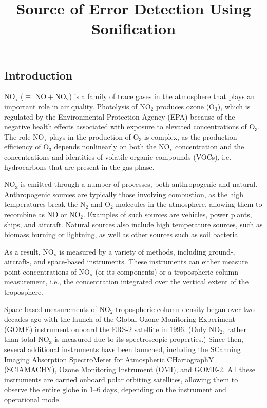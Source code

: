 \documentclass[a4paper,10pt,oneside]{article}
\title{Source of Error Detection Using Sonification}
\newcommand{\ce}[1]{$\mathrm{#1}$}
\begin{document}
\ninept
\maketitle

\begin{sloppy}

\begin{abstract}

\end{abstract}

\section{Introduction}
\label{sec:intro}

\ce{NO_x} ($\equiv$ \ce{NO + NO_2}) is a family of trace gases in the atmosphere that plays an important role in air quality.  Photolysis of \ce{NO_2} produces ozone (\ce{O_3}), which is regulated by the Environmental Protection Agency (EPA) because of the negative health effects associated with exposure to elevated concentrations of \ce{O_3}. The role \ce{NO_x} plays in the production of \ce{O_3} is complex, as the production efficiency of \ce{O_3} depends nonlinearly on both the \ce{NO_x} concentration and the concentrations and identities of volatile organic compounds (VOCs), i.e. hydrocarbons that are present in the gas phase.

\ce{NO_x} is emitted through a number of processes, both anthropogenic and natural. Anthropogenic sources are typically those involving combustion, as the high temperatures break the \ce{N_2} and \ce{O_2} molecules in the atmosphere, allowing them to recombine as \ce{NO} or \ce{NO_2}. Examples of such sources are vehicles, power plants, ships, and aircraft. Natural sources also include high temperature sources, such as biomass burning or lightning, as well as other sources such as soil bacteria.

As a result, \ce{NO_x} is measured by a variety of methods, including ground-, aircraft-, and space-based instruments. These instruments can either measure point concentrations of \ce{NO_x} (or its components) or a tropospheric column measurement, i.e., the concentration integrated over the vertical extent of the troposphere.

Space-based measurements of \ce{NO_2} tropospheric column density began over two decades ago with the launch of the Global Ozone Monitoring Experiment (GOME) instrument onboard the ERS-2 satellite in 1996. (Only \ce{NO_2}, rather than total \ce{NO_x} is measured due to its spectroscopic properties.) Since then, several additional instruments have been launched, including the SCanning Imaging Absorption SpectroMeter for Atmospheric CHartographY (SCIAMACHY), Ozone Monitoring Instrument (OMI), and GOME-2. All these instruments are carried onboard polar orbiting satellites, allowing them to observe the entire globe in 1--6 days, depending on the instrument and operational mode.


\end{sloppy}
\end{document}

